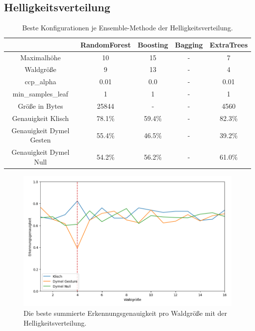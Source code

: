 \subsection{Helligkeitsverteilung}
\begin{table}[h!]
    \centering
    \begin{tabular}{ | c | c | c | c | c |}
        \hline
        & RandomForest & Boosting & Bagging & ExtraTrees \\\hline
        Maximalhöhe & 10 & 15 & - & 7 \\\hline
        Waldgröße & 9 & 13 & - & 4 \\\hline
        ccp\_alpha & 0.01 & 0.0 & - & 0.01 \\\hline
        min\_samples\_leaf & 1 & 1 & - & 1 \\\hline
        Größe in Bytes & 25844 & - & - & 4560 \\\hline
        Genauigkeit Klisch & 78.1\% & 59.4\% & - & 82.3\% \\\hline
        Genauigkeit Dymel Gesten & 55.4\% & 46.5\% & - & 39.2\% \\\hline
        Genauigkeit Dymel Null & 54.2\% & 56.2\% & - & 61.0\% \\\hline
    \end{tabular}
    \caption{Beste Konfigurationen je Ensemble-Methode der Helligkeitsverteilung.}
    \label{tab:helligkeitsverteilung}
\end{table}
\begin{figure}[h!]
    \centering
    \includegraphics[width=\linewidth]{images/helligkeitsverteilung_acc_per_size.png}
    \caption{Die beste summierte Erkennungsgenauigkeit pro Waldgröße mit der Helligkeitsverteilung.}
    \label{fig:helligkeitsverteilung_per_forest_size}
\end{figure}
